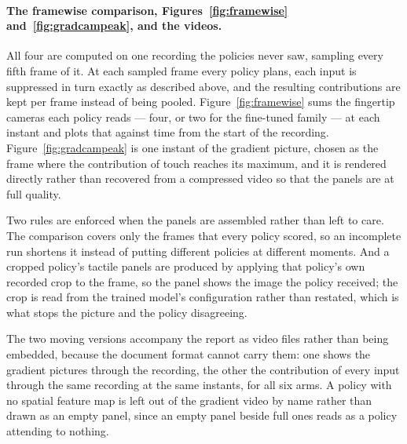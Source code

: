 \paragraph{The framewise comparison, Figures~\ref{fig:framewise}
and~\ref{fig:gradcampeak}, and the videos.}
All four are computed on one recording the policies never saw, sampling every
fifth frame of it. At each sampled frame every policy plans, each input is
suppressed in turn exactly as described above, and the resulting contributions
are kept per frame instead of being pooled. Figure~\ref{fig:framewise} sums the
fingertip cameras each policy reads --- four, or two for the fine-tuned
family --- at each instant and plots that against time from the
start of the recording. Figure~\ref{fig:gradcampeak} is one instant of the
gradient picture, chosen as the frame where the contribution of touch reaches
its maximum, and it is rendered directly rather than recovered from a compressed
video so that the panels are at full quality.

Two rules are enforced when the panels are assembled rather than left to care.
The comparison covers only the frames that every policy scored, so an
incomplete run shortens it instead of putting different policies at different
moments. And a cropped policy's tactile panels are produced by applying that
policy's own recorded crop to the frame, so the panel shows the image the policy
received; the crop is read from the trained model's configuration rather than
restated, which is what stops the picture and the policy disagreeing.

The two moving versions accompany the report as video files rather than being
embedded, because the document format cannot carry them: one shows the gradient
pictures through the recording, the other the contribution of every input
through the same recording at the same instants, for all six arms. A policy with no spatial
feature map is left out of the gradient video by name rather than drawn as an
empty panel, since an empty panel beside full ones reads as a policy attending
to nothing.
